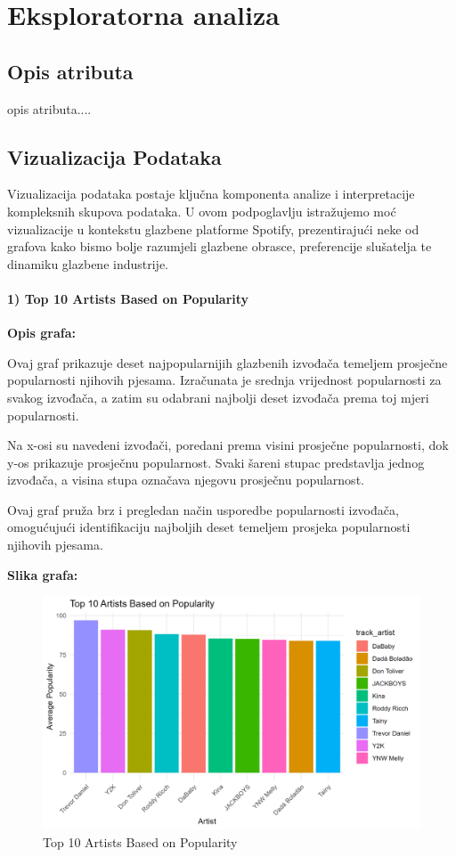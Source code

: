 \chapter{Eksploratorna analiza}

\section{Opis atributa}
opis atributa....

\section{Vizualizacija Podataka}
	Vizualizacija podataka postaje ključna komponenta analize i interpretacije kompleksnih skupova podataka. 
	U ovom podpoglavlju istražujemo moć vizualizacije u kontekstu glazbene platforme Spotify, prezentirajući neke od grafova kako bismo bolje razumjeli glazbene obrasce, preferencije slušatelja te dinamiku glazbene industrije.
	
	\subsubsection{1) Top 10 Artists Based on Popularity}
	
	\textbf{Opis grafa:}
	
	Ovaj graf prikazuje deset najpopularnijih glazbenih izvođača temeljem prosječne popularnosti njihovih pjesama. Izračunata je srednja vrijednost popularnosti za svakog izvođača, a zatim su odabrani najbolji deset izvođača prema toj mjeri popularnosti.
	
	Na x-osi su navedeni izvođači, poredani prema visini prosječne popularnosti, dok y-os prikazuje prosječnu popularnost. Svaki šareni stupac predstavlja jednog izvođača, a visina stupa označava njegovu prosječnu popularnost.
	
	Ovaj graf pruža brz i pregledan način usporedbe popularnosti izvođača, omogućujući identifikaciju najboljih deset temeljem prosjeka popularnosti njihovih pjesama.
	
	\textbf{Slika grafa:}
	\begin{figure}[H]
		\includegraphics[scale=0.9]{slike/Top 10 popularity}
		\centering
		\caption{Top 10 Artists Based on Popularity}
		
	\end{figure}

\eject



